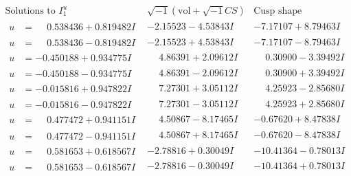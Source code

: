 \documentclass[1p]{elsarticle_modified}
\theoremstyle{definition}
\newcommand{\I}{\sqrt{-1}}
\begin{document}
$$\begin{array}{c|c|c}  
\text{Solutions to }I^u_{1}& \I (\text{vol} + \sqrt{-1}CS) & \text{Cusp shape}\\
 \hline 
\begin{aligned}
u &= \phantom{-}0.538436 + 0.819482 I\end{aligned}
 & -2.15523 - 4.53843 I & -7.17107 + 8.79463 I \\ \hline\begin{aligned}
u &= \phantom{-}0.538436 - 0.819482 I\end{aligned}
 & -2.15523 + 4.53843 I & -7.17107 - 8.79463 I \\ \hline\begin{aligned}
u &= -0.450188 + 0.934775 I\end{aligned}
 & \phantom{-}4.86391 + 2.09612 I & \phantom{-}0.30900 - 3.39492 I \\ \hline\begin{aligned}
u &= -0.450188 - 0.934775 I\end{aligned}
 & \phantom{-}4.86391 - 2.09612 I & \phantom{-}0.30900 + 3.39492 I \\ \hline\begin{aligned}
u &= -0.015816 + 0.947822 I\end{aligned}
 & \phantom{-}7.27301 + 3.05112 I & \phantom{-}4.25923 - 2.85680 I \\ \hline\begin{aligned}
u &= -0.015816 - 0.947822 I\end{aligned}
 & \phantom{-}7.27301 - 3.05112 I & \phantom{-}4.25923 + 2.85680 I \\ \hline\begin{aligned}
u &= \phantom{-}0.477472 + 0.941151 I\end{aligned}
 & \phantom{-}4.50867 - 8.17465 I & -0.67620 + 8.47838 I \\ \hline\begin{aligned}
u &= \phantom{-}0.477472 - 0.941151 I\end{aligned}
 & \phantom{-}4.50867 + 8.17465 I & -0.67620 - 8.47838 I \\ \hline\begin{aligned}
u &= \phantom{-}0.581653 + 0.618567 I\end{aligned}
 & -2.78816 + 0.30049 I & -10.41364 - 0.78013 I \\ \hline\begin{aligned}
u &= \phantom{-}0.581653 - 0.618567 I\end{aligned}
 & -2.78816 - 0.30049 I & -10.41364 + 0.78013 I \\ \hline\begin{aligned}

\end{aligned}
\end{array}$$
\end{document}
